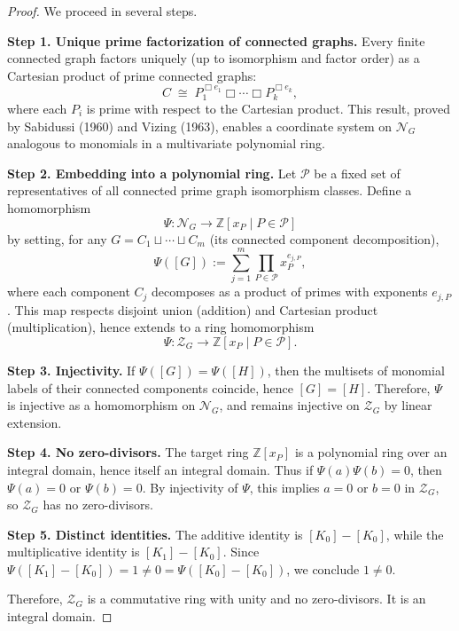 \documentclass[11pt]{article}
\theoremstyle{definition}
\theoremstyle{plain}
\theoremstyle{remark}
\begin{document}
\begin{proof}
We proceed in several steps.

\textbf{Step 1. Unique prime factorization of connected graphs.}
Every finite connected graph factors uniquely (up to isomorphism and factor order) as a Cartesian product of prime connected graphs:
\[
C \;\cong\; P_1^{\Box e_1} \Box \cdots \Box P_k^{\Box e_k},
\]
where each \(P_i\) is prime with respect to the Cartesian product. This result, proved by Sabidussi (1960) and Vizing (1963), enables a coordinate system on \(\mathcal{N}_G\) analogous to monomials in a multivariate polynomial ring.

\vspace{0.5em}
\textbf{Step 2. Embedding into a polynomial ring.}
Let \(\mathcal{P}\) be a fixed set of representatives of all connected prime graph isomorphism classes. Define a homomorphism
\[
\Psi \colon \mathcal{N}_G \longrightarrow \mathbb{Z}[x_P \mid P \in \mathcal{P}]
\]
by setting, for any \(G = C_1 \sqcup \cdots \sqcup C_m\) (its connected component decomposition),
\[
\Psi([G]) := \sum_{j=1}^m \prod_{P \in \mathcal{P}} x_P^{e_{j,P}},
\]
where each component \(C_j\) decomposes as a product of primes with exponents \(e_{j,P}\). This map respects disjoint union (addition) and Cartesian product (multiplication), hence extends to a ring homomorphism
\[
\Psi \colon \mathcal{Z}_G \longrightarrow \mathbb{Z}[x_P \mid P \in \mathcal{P}].
\]

\vspace{0.5em}
\textbf{Step 3. Injectivity.}
If \(\Psi([G]) = \Psi([H])\), then the multisets of monomial labels of their connected components coincide, hence \([G] = [H]\). Therefore, \(\Psi\) is injective as a homomorphism on \(\mathcal{N}_G\), and remains injective on \(\mathcal{Z}_G\) by linear extension.

\vspace{0.5em}
\textbf{Step 4. No zero-divisors.}
The target ring \(\mathbb{Z}[x_P]\) is a polynomial ring over an integral domain, hence itself an integral domain. Thus if \(\Psi(a)\Psi(b) = 0\), then \(\Psi(a) = 0\) or \(\Psi(b) = 0\). By injectivity of \(\Psi\), this implies \(a = 0\) or \(b = 0\) in \(\mathcal{Z}_G\), so \(\mathcal{Z}_G\) has no zero-divisors.

\vspace{0.5em}
\textbf{Step 5. Distinct identities.}
The additive identity is \([K_0] - [K_0]\), while the multiplicative identity is \([K_1] - [K_0]\). Since \(\Psi([K_1] - [K_0]) = 1 \ne 0 = \Psi([K_0] - [K_0])\), we conclude \(1 \ne 0\).

\vspace{0.5em}
Therefore, \(\mathcal{Z}_G\) is a commutative ring with unity and no zero-divisors. It is an integral domain.
\end{proof}
\end{document}
